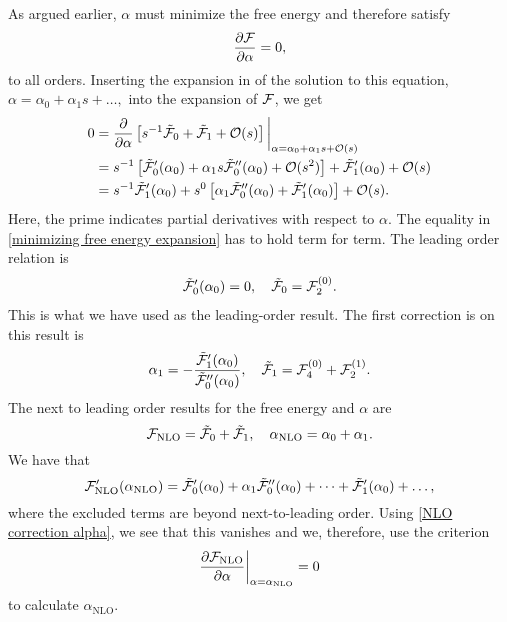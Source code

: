 %
As argued earlier, $\alpha$ must minimize the free energy and therefore satisfy
%
\begin{equation}
    \pdv{\mathcal{F}}{\alpha} = 0,
\end{equation}
%
to all orders.
Inserting the expansion in of the solution to this equation, 
$
\alpha = \alpha_0 + \alpha_1 s + \dots,
$
into the expansion of $\mathcal{F}$, we get
%
\begin{align}
    \nonumber
    0 &
    = 
    \pdv{}{\alpha}
    \left[
        s^{-1}\tilde {\mathcal{F}}_0
        + 
        \tilde {\mathcal{F}}_1
        +
        \mathcal O(s)
    \right]
    \bigg|_{\alpha=\alpha_0 + \alpha_1 s + \mathcal O(s)} 
    \\ \nonumber
    & = 
    s^{-1 }
    \left[
        \tilde {\mathcal{F}}_0'(\alpha_0)
        +
        \alpha_1 s
        \tilde {\mathcal{F}}_0''(\alpha_0)
        +
        \mathcal O(s^2)
    \right]
    +
    \tilde{\mathcal{F}}_1'(\alpha_0)
    +
    \mathcal O(s) \\
    &
    =
    s^{-1} \tilde{\mathcal{F}}_1'(\alpha_0)
    + s^{0}
    \left[
        \alpha_1
        \tilde {\mathcal{F}}_0''(\alpha_0)
        +
    \tilde{\mathcal{F}}_1'(\alpha_0)
    \right]
    +
    \mathcal O(s).
    \label{minimizing free energy expansion}
\end{align}
%
Here, the prime indicates partial derivatives with respect to $\alpha$.
The equality in \autoref{minimizing free energy expansion} has to hold term for term.
The leading order relation is
%
\begin{align*}
    \tilde {\mathcal{F}}_0'(\alpha_0) = 0, \quad
    \tilde {\mathcal{F}}_0 = \mathcal{F}_2^{(0)}.
\end{align*}
%
This is what we have used as the leading-order result. 
The first correction is on this result is
%
\begin{equation}
    \label{NLO correction alpha}
    \alpha_1 = - \frac{\tilde {\mathcal{F}}_1'(\alpha_0)}{{\tilde {\mathcal{F}}_0''(\alpha_0)}},
    \quad 
    \tilde {\mathcal{F}}_1 = \mathcal{F}_{4}^{(0)} + \mathcal{F}_{2}^{(1)}.
\end{equation}
%
The next to leading order results for the free energy and $\alpha$ are
%
\begin{equation}
    \mathcal{F}_\mathrm{NLO} = \tilde {\mathcal{F}}_0 + \tilde {\mathcal{F}}_1, \quad
    \alpha_\mathrm{NLO} = \alpha_0 + \alpha_1.
\end{equation}
%
We have that
%
\begin{equation}
    \mathcal{F}_\mathrm{NLO}'(\alpha_\mathrm{NLO})
    = \tilde {\mathcal{F}}_0'(\alpha_0) + \alpha_1 \tilde {\mathcal{F}}_0''(\alpha_0) + \dots
    + \tilde {\mathcal{F}}_1'(\alpha_0) + \dots,
\end{equation}
%
where the excluded terms are beyond next-to-leading order.
Using \autoref{NLO correction alpha}, we see that this vanishes and we, therefore, use the criterion
%
\begin{equation}
    \label{alpha nlo method 2}
    \pdv{\mathcal{F}_\mathrm{NLO}}{\alpha} \bigg|_{\alpha=\alpha_{\mathrm{NLO}}} = 0
\end{equation}
%
to calculate $\alpha_\text{NLO}$.

